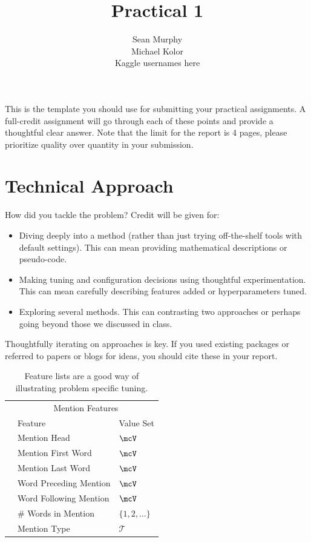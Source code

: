 \documentclass[11pt]{article}
\title{Practical 1}
\author{Sean Murphy \\ Michael Kolor \\
Kaggle usernames here}
\begin{document}
\maketitle{}


\noindent This is the template you should use for submitting your practical assignments. 
A full-credit assignment will go through each of these points and provide a thoughtful 
clear answer.  Note that the limit for the report is 4 pages, please prioritize quality over 
quantity in your submission.

\section{Technical Approach}

How did you tackle the problem? Credit will be given for:

  \begin{itemize}
  \item Diving deeply into a method (rather than just trying
    off-the-shelf tools with default settings). This can mean 
    providing mathematical descriptions or pseudo-code.
  \item Making tuning and configuration decisions using thoughtful experimentation.  
    This can mean carefully describing features added or hyperparameters tuned.
  \item Exploring several methods. This can contrasting two approaches
    or perhaps going beyond those we discussed in class.
  \end{itemize}

  \noindent Thoughtfully iterating on approaches is key.
  If you used existing packages or referred to papers or blogs for ideas,
  you should cite these in your report. 

  \begin{table}
    \centering
    \begin{tabular}{@{}lll@{}}
      &\multicolumn{2}{c}{Mention Features  } \\
      & Feature & Value Set\\
      \midrule
      & Mention Head & $\mcV$ \\
      & Mention First Word & $\mcV$ \\
      & Mention Last Word & $\mcV$ \\
      & Word Preceding Mention & $\mcV$ \\
      & Word Following Mention & $\mcV$\\
      & \# Words in Mention & $\{1, 2, \ldots \}$ \\
      & Mention Type & $\mathcal{T}$ \\
      \bottomrule
      
    \end{tabular}
    \caption{Feature lists are a good way of illustrating problem specific tuning.}
  \end{table}
\end{document}
